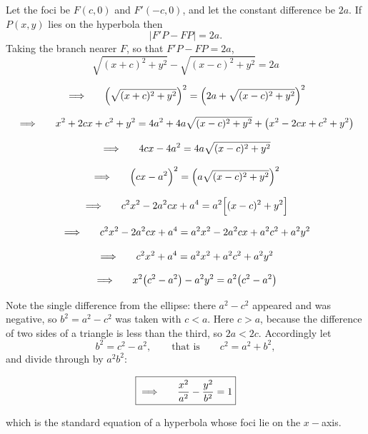 \documentclass[11pt,a4paper]{article}
\theoremstyle{definition}
\begin{document}
Let the foci be $F(c,0)$ and $F'(-c,0)$, and let the constant difference be
$2a$. If $P(x,y)$ lies on the hyperbola then
$$\left|F'P - FP\right| = 2a .$$
Taking the branch nearer $F$, so that $F'P - FP = 2a$,
$$\sqrt{(x + c)^2 + y^2} - \sqrt{(x - c)^2 + y^2} = 2a$$

$$\implies\hspace{0.5cm} \Big(\sqrt{(x + c)^2 + y^2}\Big)^2
= \Big(2a + \sqrt{(x - c)^2 + y^2}\Big)^2$$

$$\implies\hspace{0.5cm} x^2 + 2cx + c^2 + y^2
= 4a^2 + 4a\sqrt{(x - c)^2 + y^2} + \big(x^2 - 2cx + c^2 + y^2\big)$$

$$\implies\hspace{0.5cm} 4cx - 4a^2 = 4a\sqrt{(x - c)^2 + y^2}$$

$$\implies\hspace{0.5cm} \Big(cx - a^2\Big)^2 = \Big(a\sqrt{(x - c)^2 + y^2}\Big)^2$$

$$\implies\hspace{0.5cm} c^2x^2 - 2a^2cx + a^4
= a^2\Big[(x - c)^2 + y^2\Big]$$

$$\implies\hspace{0.5cm} c^2x^2 - 2a^2cx + a^4
= a^2x^2 - 2a^2cx + a^2c^2 + a^2y^2$$

$$\implies\hspace{0.5cm} c^2x^2 + a^4 = a^2x^2 + a^2c^2 + a^2y^2$$

$$\implies\hspace{0.5cm} x^2\big(c^2 - a^2\big) - a^2y^2 = a^2\big(c^2 - a^2\big)$$

Note the single difference from the ellipse: there $a^2 - c^2$ appeared and was
negative, so $b^2 = a^2 - c^2$ was taken with $c<a$. Here $c>a$, because the
difference of two sides of a triangle is less than the third, so $2a < 2c$.
Accordingly let
$$b^2 = c^2 - a^2 , \qquad\text{that is}\qquad c^2 = a^2 + b^2 ,$$
and divide through by $a^2b^2$:

$$\boxed{\implies\hspace{0.5cm}\dfrac{x^2}{a^2} - \dfrac{y^2}{b^2} = 1}$$

which is the standard equation of a hyperbola whose foci lie on the $x-$axis.
\end{document}
